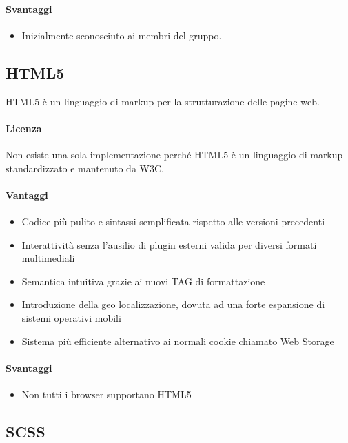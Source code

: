 \paragraph{Svantaggi} 
\begin{itemize}
	\item Inizialmente sconosciuto ai membri del gruppo.	
\end{itemize}

\subsection{HTML5}
HTML5 è un linguaggio di markup per la strutturazione delle pagine web.

\paragraph{Licenza}  
Non esiste una sola implementazione perché HTML5 è un linguaggio di markup standardizzato e mantenuto da W3C.



\paragraph{Vantaggi}
\begin{itemize}
	\item Codice più pulito e sintassi semplificata rispetto alle versioni precedenti
	\item Interattività senza l’ausilio di plugin esterni valida per diversi formati multimediali
	\item Semantica intuitiva grazie ai nuovi TAG di formattazione
	\item Introduzione della geo localizzazione, dovuta ad una forte espansione di sistemi operativi mobili
	\item Sistema più efficiente alternativo ai normali cookie chiamato Web Storage 

\end{itemize}

\paragraph{Svantaggi} 
\begin{itemize}
	\item Non tutti i browser supportano HTML5
\end{itemize}

\subsection{SCSS}

